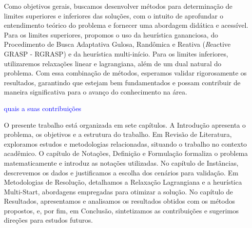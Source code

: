 Como objetivos gerais, buscamos desenvolver métodos para determinação de limites superiores e inferiores das soluções, com o intuito de aprofundar o entendimento teórico do problema e fornecer uma abordagem didática e acessível. Para os limites superiores, propomos o uso da heurística gananciosa, do Procedimento de Busca Adaptativa Gulosa, Randômica e Reativa ({\textit Reactive GRASP - RGRASP}) e da heurística multi-início. Para os limites inferiores, utilizaremos relaxações linear e lagrangiana, além de um dual natural do problema. Com essa combinação de métodos, esperamos validar rigorosamente os resultados, garantindo que estejam bem fundamentados e possam contribuir de maneira significativa para o avanço do conhecimento na área.

\textcolor{blue}{ quais a suas contribuições}


O presente trabalho está organizada em sete capítulos. A Introdução apresenta o problema, os objetivos e a estrutura do trabalho. Em Revisão de Literatura, exploramos estudos e metodologias relacionadas, situando o trabalho no contexto acadêmico. O capítulo de Notações, Definição e Formulação formaliza o problema matematicamente e introduz as notações utilizadas. No capítulo de Instâncias, descrevemos os dados e justificamos a escolha dos cenários para validação. Em Metodologias de Resolução, detalhamos a Relaxação Lagrangiana e a heurística Multi-Start, abordagens empregadas para otimizar a solução. No capítulo de Resultados, apresentamos e analisamos os resultados obtidos com os métodos propostos, e, por fim, em Conclusão, sintetizamos as contribuições e sugerimos direções para estudos futuros.

